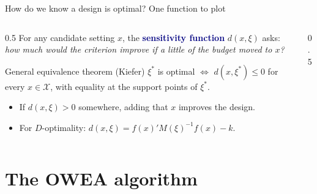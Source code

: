 \documentclass[aspectratio=169,10pt]{beamer}
\newcommand{\key}[1]{\textcolor{navy}{\textbf{#1}}}
\begin{document}
\begin{frame}{How do we know a design is optimal? One function to plot}
  \begin{columns}[c]
    \begin{column}{0.5\textwidth}
      \small For any candidate setting $x$, the \key{sensitivity function} $d(x,\xi)$ asks:
      \emph{how much would the criterion improve if a little of the budget moved to $x$?}
      \vspace{0.3em}
      \begin{block}{General equivalence theorem (Kiefer)}
        $\xi^*$ is optimal \;$\Longleftrightarrow$\; $d(x,\xi^*)\le 0$ for every $x\in\mathcal X$,
        with equality at the support points of $\xi^*$.
      \end{block}
      \begin{itemize}
        \item If $d(x,\xi)>0$ somewhere, adding that $x$ improves the design.
        \item For $D$-optimality: $d(x,\xi)=f(x)'M(\xi)^{-1}f(x)-k$.
      \end{itemize}
    \end{column}
    \begin{column}{0.5\textwidth}
    \end{column}
  \end{columns}
\end{frame}

\section{The OWEA algorithm}
\end{document}
